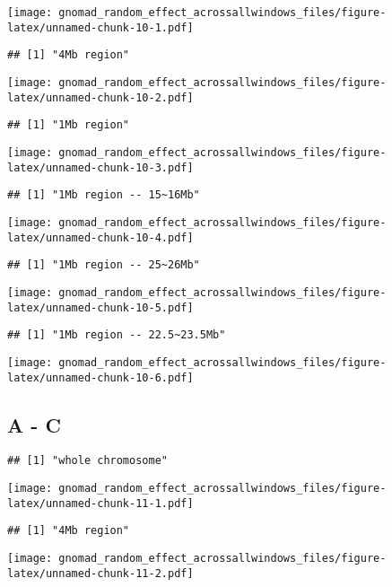 \documentclass[
]{article}
\begin{document}
\texttt{[image: gnomad\_random\_effect\_acrossallwindows\_files/figure-latex/unnamed-chunk-10-1.pdf]}

\begin{verbatim}
## [1] "4Mb region"
\end{verbatim}

\texttt{[image: gnomad\_random\_effect\_acrossallwindows\_files/figure-latex/unnamed-chunk-10-2.pdf]}

\begin{verbatim}
## [1] "1Mb region"
\end{verbatim}

\texttt{[image: gnomad\_random\_effect\_acrossallwindows\_files/figure-latex/unnamed-chunk-10-3.pdf]}

\begin{verbatim}
## [1] "1Mb region -- 15~16Mb"
\end{verbatim}

\texttt{[image: gnomad\_random\_effect\_acrossallwindows\_files/figure-latex/unnamed-chunk-10-4.pdf]}

\begin{verbatim}
## [1] "1Mb region -- 25~26Mb"
\end{verbatim}

\texttt{[image: gnomad\_random\_effect\_acrossallwindows\_files/figure-latex/unnamed-chunk-10-5.pdf]}

\begin{verbatim}
## [1] "1Mb region -- 22.5~23.5Mb"
\end{verbatim}

\texttt{[image: gnomad\_random\_effect\_acrossallwindows\_files/figure-latex/unnamed-chunk-10-6.pdf]}

\hypertarget{a---c-1}{%
\subsection{A - C}\label{a---c-1}}

\begin{verbatim}
## [1] "whole chromosome"
\end{verbatim}

\texttt{[image: gnomad\_random\_effect\_acrossallwindows\_files/figure-latex/unnamed-chunk-11-1.pdf]}

\begin{verbatim}
## [1] "4Mb region"
\end{verbatim}

\texttt{[image: gnomad\_random\_effect\_acrossallwindows\_files/figure-latex/unnamed-chunk-11-2.pdf]}
\end{document}
